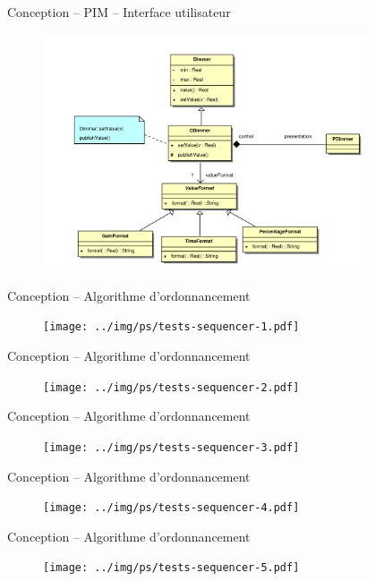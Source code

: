 \documentclass[frenchb]{beamer}
\begin{document}
\begin{frame}{Conception -- PIM -- Interface utilisateur}
    \begin{figure}
        \includegraphics[height=7cm]{../img/ps/pacdimmer-pim.pdf}
    \end{figure}
\end{frame}

\begin{frame}{Conception -- Algorithme d’ordonnancement}
    \begin{figure}
        \texttt{[image: ../img/ps/tests-sequencer-1.pdf]}
    \end{figure}
\end{frame}

\begin{frame}{Conception -- Algorithme d’ordonnancement}
    \begin{figure}
        \texttt{[image: ../img/ps/tests-sequencer-2.pdf]}
    \end{figure}
\end{frame}

\begin{frame}{Conception -- Algorithme d’ordonnancement}
    \begin{figure}
        \texttt{[image: ../img/ps/tests-sequencer-3.pdf]}
    \end{figure}
\end{frame}

\begin{frame}{Conception -- Algorithme d’ordonnancement}
    \begin{figure}
        \texttt{[image: ../img/ps/tests-sequencer-4.pdf]}
    \end{figure}
\end{frame}

\begin{frame}{Conception -- Algorithme d’ordonnancement}
    \begin{figure}
        \texttt{[image: ../img/ps/tests-sequencer-5.pdf]}
    \end{figure}
\end{frame}
\end{document}
